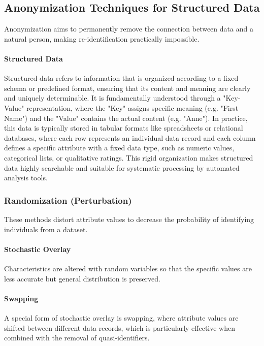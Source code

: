 \subsection{Anonymization Techniques for Structured Data}

Anonymization aims to permanently remove the connection between data and a natural person, making re-identification practically impossible.
\autocite[73--75]{Krebs2022}

\paragraph{Structured Data}

Structured data refers to information that is organized according to a fixed schema or predefined format, ensuring that its content and meaning are clearly and uniquely determinable. It is fundamentally understood through a "Key-Value" representation, where the "Key" assigns specific meaning (e.g. "First Name") and the "Value" contains the actual content (e.g. "Anne"). In practice, this data is typically stored in tabular formats like spreadsheets or relational databases, where each row represents an individual data record and each column defines a specific attribute with a fixed data type, such as numeric values, categorical lists, or qualitative ratings. This rigid organization makes structured data highly searchable and suitable for systematic processing by automated analysis tools.
\autocite[45--46]{Krebs2022}
\autocite[11--12]{schwartmann2022praxisleitfaden}


\subsubsection{Randomization (Perturbation)}
These methods distort attribute values to decrease the probability of identifying individuals from a dataset.
\autocite[83--86]{Krebs2022}

\paragraph{Stochastic Overlay}
Characteristics are altered with random variables so that the specific values are less accurate but general distribution is preserved.
\autocite[84]{Krebs2022}
\autocite[31]{schwartmann2022praxisleitfaden}

\paragraph{Swapping}
A special form of stochastic overlay is swapping, where attribute values are shifted between different data records, which is particularly effective when combined with the removal of quasi-identifiers.
\autocite[84--85]{Krebs2022}
\autocite[31]{schwartmann2022praxisleitfaden}

